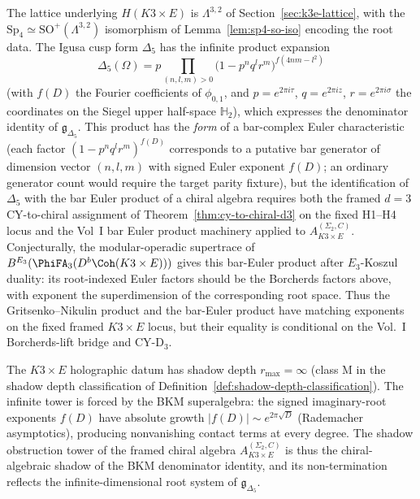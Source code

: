 \begin{proposition}
\label{prop:k3e-holographic-root-datum}
The lattice underlying $H(K3 \times E)$ is $\Lambda^{3,2}$ of
Section~\ref{sec:k3e-lattice}, with the $\mathrm{Sp}_4 \simeq
\mathrm{SO}^+(\Lambda^{3,2})$ isomorphism of
Lemma~\ref{lem:sp4-so-iso} encoding the root data. The Igusa
cusp form $\Delta_5$ has the infinite product expansion
\[
 \Delta_5(\Omega) = p \prod_{(n,l,m) > 0} \bigl(1 - p^n q^l r^m\bigr)^{f(4nm - l^2)}
\]
(with $f(D)$ the Fourier coefficients of $\phi_{0,1}$, and
$p = e^{2\pi i \tau}$, $q = e^{2\pi i z}$, $r = e^{2\pi i \sigma}$
the coordinates on the Siegel upper half-space $\mathbb{H}_2$),
which expresses the denominator identity of $\mathfrak{g}_{\Delta_5}$.
This product has the \emph{form} of a bar-complex Euler characteristic
(each factor $(1 - p^n q^l r^m)^{f(D)}$ corresponds to a putative
bar generator of dimension vector $(n, l, m)$ with signed Euler exponent
$f(D)$; an ordinary generator count would require the target parity
fixture), but the identification of $\Delta_5$ with the bar Euler
product of a chiral algebra requires both the framed $d = 3$ CY-to-chiral
assignment of Theorem~\ref{thm:cy-to-chiral-d3} on the fixed H1--H4 locus and the Vol~I bar Euler product
machinery applied to $A_{K3 \times E}^{(\Sigma_2,C)}$. Conjecturally,
the modular-operadic supertrace of
$B^{E_3}(\PhiFA_3(D^b\Coh(K3\times E)))$ gives this bar-Euler product
after $E_3$-Koszul duality: its root-indexed Euler factors should be the
Borcherds factors above, with exponent the superdimension of the
corresponding root space. Thus the Gritsenko--Nikulin product and the
bar-Euler product have matching exponents on the fixed framed
$K3\times E$ locus, but their equality is conditional on the Vol.~I
Borcherds-lift bridge and CY-D$_3$.
\end{proposition}

\begin{remark}
\label{rem:k3e-holographic-shadow-depth}
The $K3 \times E$ holographic datum has shadow depth $r_{\max} = \infty$
(class M in the shadow depth classification of
Definition~\ref{def:shadow-depth-classification}).
The infinite tower is forced by the BKM superalgebra:
the signed imaginary-root exponents $f(D)$ have absolute growth
\(\lvert f(D)\rvert \sim e^{2\pi\sqrt{D}}\) (Rademacher asymptotics),
producing nonvanishing contact terms at every degree.
The shadow obstruction tower of the framed chiral algebra $A_{K3 \times E}^{(\Sigma_2,C)}$
is thus the chiral-algebraic shadow of the BKM denominator identity,
and its non-termination reflects the infinite-dimensional root system
of $\mathfrak{g}_{\Delta_5}$.
\end{remark}


